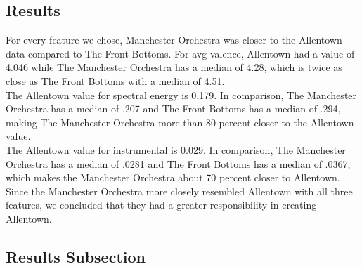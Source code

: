 \documentclass{article}\usepackage[]{graphicx}\usepackage[]{xcolor}
\begin{document}
\begin{multicols}{2}
\section{Results}
  For every feature we chose, Manchester Orchestra was closer to the Allentown data compared to The Front Bottoms. For avg valence, Allentown had a value of 4.046 while The Manchester Orchestra has a median of 4.28, which is twice
  as close as The Front Bottoms with a median of 4.51. \\
  The Allentown value for spectral energy is 0.179. In comparison, The Manchester Orchestra has a median of .207 and The Front Bottoms has a median of .294, making The Manchester Orchestra more than 80 percent closer to the Allentown value.\\ 
  The Allentown value for instrumental is 0.029. In comparison, The Manchester Orchestra has a median of .0281 and The Front Bottoms has a median of .0367, which makes the Manchester Orchestra about 70 percent closer to 
  Allentown. \\
  Since the Manchester Orchestra more closely resembled Allentown with all three features, 
  we concluded that they had a greater responsibility in creating Allentown.

\subsection{Results Subsection}




\end{multicols}
\end{document}
